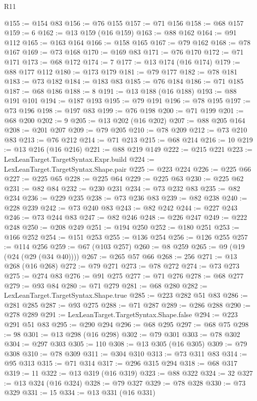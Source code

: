 \begin{lexlean}{R11}
\begin{coremodule}
@155 := @154 @83
@156 := @76 @155
@157 := @71 @156
@158 := @68 @157
@159 := 6
@162 := @13 @159 (@16 @159)
@163 := @88 @162
@164 := @91 @112
@165 := @163 @164
@166 := @158 @165
@167 := @79 @162
@168 := @78 @167
@169 := @73 @168
@170 := @169 @83
@171 := @76 @170
@172 := @71 @171
@173 := @68 @172
@174 := 7
@177 := @13 @174 (@16 @174)
@179 := @88 @177 @112
@180 := @173 @179
@181 := @79 @177
@182 := @78 @181
@183 := @73 @182
@184 := @183 @83
@185 := @76 @184
@186 := @71 @185
@187 := @68 @186
@188 := 8
@191 := @13 @188 (@16 @188)
@193 := @88 @191 @101
@194 := @187 @193
@195 := @79 @191
@196 := @78 @195
@197 := @73 @196
@198 := @197 @83
@199 := @76 @198
@200 := @71 @199
@201 := @68 @200
@202 := 9
@205 := @13 @202 (@16 @202)
@207 := @88 @205 @164
@208 := @201 @207
@209 := @79 @205
@210 := @78 @209
@212 := @73 @210 @83
@213 := @76 @212
@214 := @71 @213
@215 := @68 @214
@216 := 10
@219 := @13 @216 (@16 @216)
@221 := @88 @219 @149
@222 := @215 @221
@223 := LexLeanTarget.TargetSyntax.Expr.build
@224 := LexLeanTarget.TargetSyntax.Shape.pair
@225 := @223 @224
@226 := @225 @66
@227 := @225 @65
@228 := @225 @64
@229 := @225 @63
@230 := @225 @62
@231 := @82 @84
@232 := @230 @231
@234 := @73 @232 @83
@235 := @82 @234
@236 := @229 @235
@238 := @73 @236 @83
@239 := @82 @238
@240 := @228 @239
@242 := @73 @240 @83
@243 := @82 @242
@244 := @227 @243
@246 := @73 @244 @83
@247 := @82 @246
@248 := @226 @247
@249 := @222 @248
@250 := @208 @249
@251 := @194 @250
@252 := @180 @251
@253 := @166 @252
@254 := @151 @253
@255 := @136 @254
@256 := @126 @255
@257 := @114 @256
@259 := @67 (@103 @257)
@260 := @8 @259
@265 := @9 (@19 (@24 (@29 (@34 @40))))
@267 := @265 @57 @66
@268 := 256
@271 := @13 @268 (@16 @268)
@272 := @79 @271
@273 := @78 @272
@274 := @73 @273
@275 := @274 @83
@276 := @91 @275
@277 := @71 @276
@278 := @68 @277
@279 := @93 @84
@280 := @71 @279
@281 := @68 @280
@282 := LexLeanTarget.TargetSyntax.Shape.true
@285 := @223 @282 @51 @83
@286 := @281 @285
@287 := @93 @275
@288 := @71 @287
@289 := @286 @288
@290 := @278 @289
@291 := LexLeanTarget.TargetSyntax.Shape.false
@294 := @223 @291 @51 @83
@295 := @290 @294
@296 := @68 @295
@297 := @68 @75
@298 := 98
@301 := @13 @298 (@16 @298)
@302 := @79 @301
@303 := @78 @302
@304 := @297 @303
@305 := 110
@308 := @13 @305 (@16 @305)
@309 := @79 @308
@310 := @78 @309
@311 := @304 @310
@313 := @73 @311 @83
@314 := @95 @313
@315 := @71 @314
@317 := @296 @315 @294
@318 := @68 @317
@319 := 11
@322 := @13 @319 (@16 @319)
@323 := @88 @322
@324 := 32
@327 := @13 @324 (@16 @324)
@328 := @79 @327
@329 := @78 @328
@330 := @73 @329
@331 := 15
@334 := @13 @331 (@16 @331)

\end{coremodule}
\end{lexlean}
